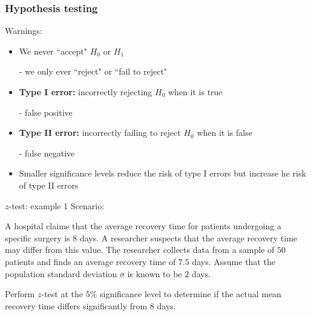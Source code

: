 \documentclass[t,8pt]{beamer}%
\begin{document}
\begin{frame}
    \frametitle{Hypothesis testing}
    Warnings:
    \begin{itemize}
        \item We never ``accept" $H_0$ or $H_1$ \par- we only ever ``reject" or ``fail to reject"
        \item {\bf Type I error:} incorrectly rejecting $H_0$ when it is true \par
        - false positive
        \item {\bf Type II error:} incorrectly failing to reject $H_0$ when it is false \par
        - false negative
        \item Smaller significance levels reduce the risk of type I errors but increase he risk of type II errors
    \end{itemize}
\end{frame}

\begin{frame}{$z$-test: example 1}
    Scenario: \par
    A hospital claims that the average recovery time for patients undergoing a specific surgery is $8$ days. A researcher suspects that the average recovery time may differ from this value. The researcher collects data from a sample of $5$0 patients and finds an average recovery time of $7.5$ days. Assume that the population standard deviation $\sigma$ is known to be $2$ days. \par
    
    Perform $z$-test at the $5\%$ significance level to determine if the actual mean recovery time differs significantly from $8$ days.
\end{frame}
\end{document}
